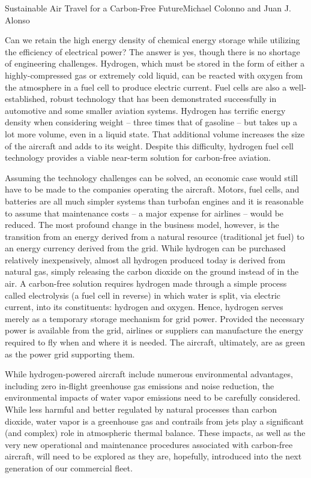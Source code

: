 \documentclass[10pt]{papertex}
\begin{document}
\begin{news}{2}{Sustainable Air Travel for a Carbon-Free Future}{Michael Colonno and Juan J. Alonso}{}{}

Can we retain the high energy density of chemical energy storage while 
utilizing the efficiency of electrical power? The answer is yes, though there 
is no shortage of engineering challenges. Hydrogen, which must be stored in 
the form of either a highly-compressed gas or extremely cold liquid, can be 
reacted with oxygen from the atmosphere in a fuel cell to produce electric 
current. Fuel cells are also a well-established, robust technology that has 
been demonstrated successfully in automotive and some smaller aviation systems. 
Hydrogen has terrific energy density when considering weight – three times 
that of gasoline – but takes up a lot more volume, even in a liquid state. 
That additional volume increases the size of the aircraft and adds to its 
weight. Despite this difficulty, hydrogen fuel cell technology provides a 
viable near-term solution for carbon-free aviation.

Assuming the technology challenges can be solved, an economic case would 
still have to be made to the companies operating the aircraft. Motors, fuel 
cells, and batteries are all much simpler systems than turbofan engines and 
it is reasonable to assume that maintenance costs – a major expense for 
airlines – would be reduced. The most profound change in the business model, 
however, is the transition from an energy derived from a natural resource 
(traditional jet fuel) to an energy currency derived from the grid. While 
hydrogen can be purchased relatively inexpensively, almost all hydrogen 
produced today is derived from natural gas, simply releasing the carbon 
dioxide on the ground instead of in the air. A carbon-free solution requires 
hydrogen made through a simple process called electrolysis (a fuel cell in 
reverse) in which water is split, via electric current, into its constituents: 
hydrogen and oxygen. Hence, hydrogen serves merely as a temporary storage 
mechanism for grid power. Provided the necessary power is available from the 
grid, airlines or suppliers can manufacture the energy required to fly when 
and where it is needed. The aircraft, ultimately, are as green as the power 
grid supporting them.

While hydrogen-powered aircraft include numerous environmental advantages, 
including zero in-flight greenhouse gas emissions and noise reduction, the 
environmental impacts of water vapor emissions need to be carefully considered. 
While less harmful and better regulated by natural processes than carbon 
dioxide, water vapor is a greenhouse gas and contrails from jets play a 
significant (and complex) role in atmospheric thermal balance. These impacts, 
as well as the very new operational and maintenance procedures associated 
with carbon-free aircraft, will need to be explored as they are, hopefully, 
introduced into the next generation of our commercial fleet.


\end{news}
\end{document}
